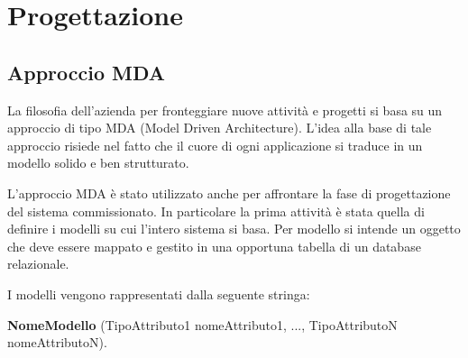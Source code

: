 \chapter{Progettazione}
\label{cap:progettazione}


\setlength{\parskip}{3ex}

\section{Approccio MDA}
La filosofia dell'azienda per fronteggiare nuove attività e progetti si basa su un approccio di tipo MDA (Model Driven Architecture). L'idea alla base di tale approccio risiede nel fatto che il cuore di ogni applicazione si traduce in un modello solido e ben strutturato. 

\setlength{\parskip}{3ex}

\noindent L'approccio MDA è stato utilizzato anche per affrontare la fase di progettazione del sistema commissionato. In particolare la prima attività è stata quella di definire i modelli su cui l'intero sistema si basa. Per modello si intende un oggetto che deve essere mappato e gestito in una opportuna tabella di un database relazionale.   

\setlength{\parskip}{3ex}

\noindent I modelli vengono rappresentati dalla seguente stringa:

\setlength{\parskip}{2ex}

\noindent \textbf{NomeModello} (TipoAttributo1 nomeAttributo1, ..., TipoAttributoN nomeAttributoN).

\pagebreak


